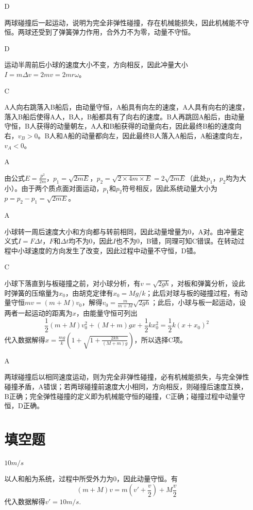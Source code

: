 \documentclass[b5paper,opensource,sourcefont,parskip]{qyxf-book}
\begin{document}
D

\solve 两球碰撞后一起运动，说明为完全非弹性碰撞，存在机械能损失，因此机械能不守恒。两球还受到了弹簧弹力作用，合外力不为零，动量不守恒。

D

\solve 运动半周前后小球的速度大小不变，方向相反，因此冲量大小\(I=m\Delta v=2mv=2mr \omega\)。

C

\solve A人向右跳落入B船后，由动量守恒，A船具有向左的速度，A人具有向右的速度，落入B船后使得A人，B人，B船都具有了向右的速度。B人再跳回A船后，由动量守恒，B人获得的动量朝左，A人和B船获得的动量向右，因此最终B船的速度向右，\(v_B>0\)。B人和A船的动量都向左，因此最终B人落入A船后，A船速度向左，\(v_A<0\)。

A

\solve 由公式\(E=\frac{p^2}{2m}\)，\(p_1=\sqrt{2mE}\)，\(p_2=\sqrt{2\times 4m\times E}=2\sqrt{2mE}\)（此处\(p_1\)，\(p_2\)均为大小）。由于两个质点面对面运动，\(p_1\)和\(p_2\)符号相反，因此系统动量大小为\(p=p_2-p_1=\sqrt{2mE}\)。

A

\solve 小球转一周后速度大小和方向都与转前相同，因此动量增量为0，A对。由冲量定义式\(I=F\Delta t\)，\(F\)和\(\Delta t\)均不为0，因此\(I\)也不为0，B错，同理可知C错误。在转动过程中小球速度的方向发生了改变，因此过程中动量不守恒，D错。

C

\solve 小球下落直到与板碰撞之前，对小球分析，有\(v=\sqrt{2gh}\)，对板和弹簧分析，设此时弹簧的压缩量为\(x_0\)，由胡克定律有\(x_0=Mg/k\)；此后对球与板的碰撞过程，有动量守恒\(mv=(m+M)v_0\)，解得\(v_0=\frac{m}{m+M}\sqrt{2gh}\)；此后，小球与板一起运动，设两者一起运动的距离为\(x\)，由能量守恒可列出
\[\frac{1}{2}(m+M)v_0^2+(M+m)gx+\frac{1}{2}kx_0^2=\frac{1}{2}k(x+x_0)^2\]
代入数据解得\(x=\frac{mg}{k}(1+\sqrt{1+\frac{2kh}{(M+m)g}})\)，所以选择C项。

A

\solve 两球碰撞后以相同速度运动，则为完全非弹性碰撞，必有机械能损失，与完全弹性碰撞矛盾，A错误；若两球碰撞前速度大小相同，方向相反，则碰撞后速度互换，B正确；完全弹性碰撞的定义即为机械能守恒的碰撞，C正确；碰撞过程中动量守恒，D正确。

\section{填空题}
$10m/s$

\solve 以人和船为系统，过程中所受外力为$ 0 $，因此动量守恒。有
\begin{equation*}
(m+M)v=m(v'+\frac{v}{2})+M\frac{v}{2} 
\end{equation*}
代入数据解得$ v'=10m/s $.
\end{document}
